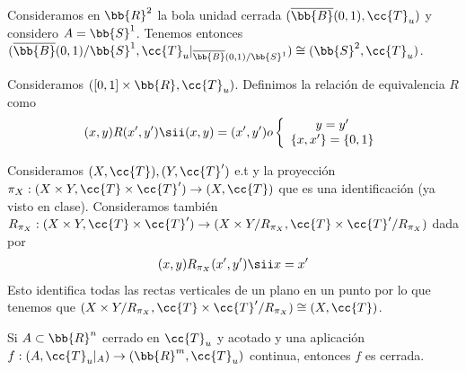 \begin{ejemplo}
    Consideramos en $\bb{R}^2$ la bola unidad cerrada $(\overline{\bb{B}}(0,1), \cc{T}_u)$ y considero $A=\bb{S}^1$. Tenemos entonces $(\overline{\bb{B}}(0,1)/\bb{S}^1, \cc{T}_u|_{\overline{\bb{B}}(0,1)/\bb{S}^1})\cong (\bb{S}^2, \cc{T}_u)$.
    \endsquare
\end{ejemplo}

\begin{ejemplo}
    Consideramos $([0,1]\times \bb{R}, \cc{T}_u)$. Definimos la relación de equivalencia $R$ como 
    \begin{align*}
        (x,y)R(x',y') \sii (x,y)=(x',y') o \left\{
        \begin{array}{c}
            y=y'\\
            \{x,x'\}=\{0,1\}
        \end{array}
        \right.
    \end{align*}
    \endsquare
\end{ejemplo}

\begin{ejemplo}
    Consideramos $(X, \cc{T}), (Y, \cc{T}')$ e.t y la proyección $\pi_X:(X\times Y, \cc{T}\times \cc{T}')\to (X, \cc{T})$ que es una identificación (ya visto en clase). Consideramos también $R_{\pi_X}: (X\times Y, \cc{T}\times \cc{T}') \to (X\times Y / R_{\pi_X}, \cc{T}\times \cc{T}'/R_{\pi_X})$ dada por 
    \begin{align*}
        (x,y)R_{\pi_X}(x',y') \sii x=x'
    \end{align*}
    Esto identifica todas las rectas verticales de un plano en un punto por lo que tenemos que $(X\times Y / R_{\pi_X}, \cc{T}\times \cc{T}'/R_{\pi_X})\cong (X, \cc{T})$.
    \endsquare
\end{ejemplo}

\begin{lema}
    Si $A\subset \bb{R}^n$ cerrado en $\cc{T}_u$ y acotado y una aplicación $f:(A, \cc{T}_u|_A)\to (\bb{R}^m, \cc{T}_u)$ continua, entonces $f$ es cerrada.
    \endsquare
\end{lema}

